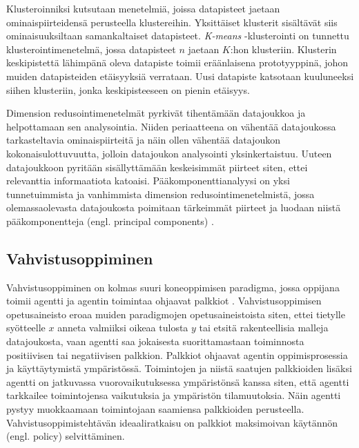 \documentclass[utf8]{gradu3}
\begin{document}
Klusteroinniksi kutsutaan menetelmiä, joissa datapisteet jaetaan ominaispiirteidensä perusteella klustereihin. Yksittäiset klusterit sisältävät siis ominaisuuksiltaan samankaltaiset datapisteet. \textit{K-means} -klusterointi on tunnettu klusterointimenetelmä, jossa datapisteet \(n\) jaetaan \(K\):hon klusteriin. Klusterin keskipistettä lähimpänä oleva datapiste toimii eräänlaisena prototyyppinä, johon muiden datapisteiden etäisyyksiä verrataan. Uusi datapiste katsotaan kuuluneeksi siihen klusteriin, jonka keskipisteeseen on pienin etäisyys.

Dimension redusointimenetelmät pyrkivät tihentämään datajoukkoa ja helpottamaan sen analysointia. Niiden periaatteena on vähentää datajoukossa tarkasteltavia ominaispiirteitä ja näin ollen vähentää datajoukon kokonaisulottuvuutta, jolloin datajoukon analysointi yksinkertaistuu. Uuteen datajoukkoon pyritään sisällyttämään keskeisimmät piirteet siten, ettei relevanttia informaatiota katoaisi. Pääkomponenttianalyysi on yksi tunnetuimmista ja vanhimmista dimension redusointimenetelmistä, jossa olemassaolevasta datajoukosta poimitaan tärkeimmät piirteet ja luodaan niistä pääkomponentteja (engl. principal components) \parencite{abdi2010principal}.

\subsection{Vahvistusoppiminen}

Vahvistusoppiminen on kolmas suuri koneoppimisen paradigma, jossa oppijana toimii agentti ja agentin toimintaa ohjaavat palkkiot \parencite{arulkumaran2017brief,jordan2015machine}. Vahvistusoppimisen opetusaineisto eroaa muiden paradigmojen opetusaineistoista siten, ettei tietylle syötteelle \(x\) anneta valmiiksi oikeaa tulosta \(y\) tai etsitä rakenteellisia malleja datajoukosta, vaan agentti saa jokaisesta suorittamastaan toiminnosta positiivisen tai negatiivisen palkkion. Palkkiot ohjaavat agentin oppimisprosessia ja käyttäytymistä ympäristössä. Toimintojen ja niistä saatujen palkkioiden lisäksi agentti on jatkuvassa vuorovaikutuksessa ympäristönsä kanssa siten, että agentti tarkkailee toimintojensa vaikutuksia ja ympäristön tilamuutoksia. Näin agentti pystyy muokkaamaan toimintojaan saamiensa palkkioiden perusteella. Vahvistusoppimistehtävän ideaaliratkaisu on palkkiot maksimoivan käytännön (engl. policy) selvittäminen.
\end{document}
